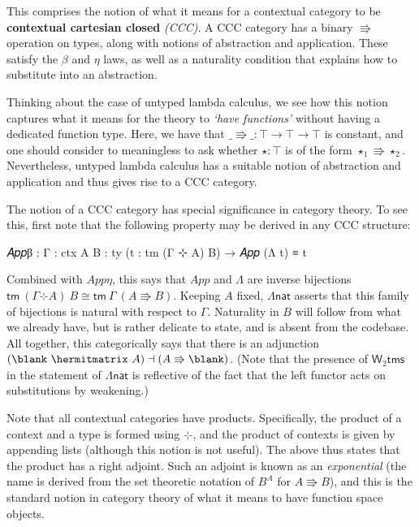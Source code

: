 This comprises the notion of what it means for a contextual category to be
\textbf{contextual cartesian closed} \emph{(CCC)}. A CCC category has a binary
$\Rrightarrow$ operation on types, along with notions of abstraction and
application. These satisfy the $\beta$ and $\eta$ laws, as well as a naturality
condition that explains how to substitute into an abstraction.

Thinking about the case of untyped lambda calculus, we see how this notion
captures what it means for the theory to \emph{`have functions'} without having
a dedicated function type. Here, we have that $\_\Rrightarrow\_ : \top \to \top
\to \top$ is constant, and one should consider to meaningless to ask whether
$\star : \top$ is of the form $\star_1 \Rrightarrow \star_2$. Nevertheless,
untyped lambda calculus has a suitable notion of abstraction and application
and thus gives rise to a CCC category.

The notion of a CCC category has special significance in category theory. To see
this, first note that the following property may be derived in any CCC
structure:
\begin{code}
  𝐴𝑝𝑝β : {Γ : ctx} {A B : ty} (t : tm (Γ ⊹ A) B) →
    𝐴𝑝𝑝 (Λ t) ≡ t
\end{code}
Combined with $\mathit{App}\eta$, this says that $\mathit{App}$ and $\Lambda$
are inverse bijections $\mathsf{tm}~(\Gamma \hermitmatrix A)~B \cong
{\mathsf{tm} ~\Gamma~(A \Rrightarrow B)}$. Keeping $A$ fixed, $Λ\mathsf{nat}$
asserts that this family of bijections is natural with respect to $\Gamma$.
Naturality in $B$ will follow from what we already have, but is rather delicate
to state, and is absent from the codebase. All together, this categorically says
that there is an adjunction $(\blank~\hermitmatrix~A) \dashv (A \Rrightarrow
\blank)$. (Note that the presence of $\mathsf{W}_\mathit{2} \mathsf{tms}$ in the
statement of $Λ\mathsf{nat}$ is reflective of the fact that the left functor
acts on substitutions by weakening.)

Note that all contextual categories have products. Specifically, the product
of a context and a type is formed using $\hermitmatrix$, and the product of
contexts is given by appending lists (although this notion is not useful).
The above thus states that the product has a right adjoint. Such an adjoint is
known as an \emph{exponential} (the name is derived from the set theoretic
notation of $B^A$ for $A \Rrightarrow B$), and this is the standard notion in
category theory of what it means to have function space objects.

